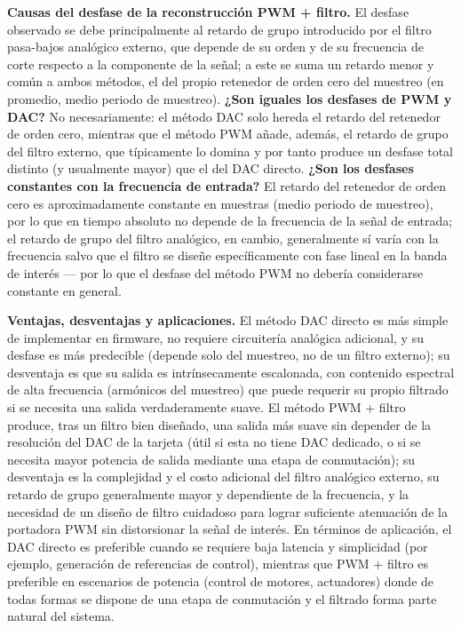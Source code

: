\textbf{Causas del desfase de la reconstrucción PWM + filtro.} El desfase observado se debe principalmente al retardo de grupo introducido por el filtro pasa-bajos analógico externo, que depende de su orden y de su frecuencia de corte respecto a la componente de la señal; a este se suma un retardo menor y común a ambos métodos, el del propio retenedor de orden cero del muestreo (en promedio, medio periodo de muestreo). \textbf{¿Son iguales los desfases de PWM y DAC?} No necesariamente: el método DAC solo hereda el retardo del retenedor de orden cero, mientras que el método PWM añade, además, el retardo de grupo del filtro externo, que típicamente lo domina y por tanto produce un desfase total distinto (y usualmente mayor) que el del DAC directo. \textbf{¿Son los desfases constantes con la frecuencia de entrada?} El retardo del retenedor de orden cero es aproximadamente constante en muestras (medio periodo de muestreo), por lo que en tiempo absoluto no depende de la frecuencia de la señal de entrada; el retardo de grupo del filtro analógico, en cambio, generalmente sí varía con la frecuencia salvo que el filtro se diseñe específicamente con fase lineal en la banda de interés — por lo que el desfase del método PWM no debería considerarse constante en general.

\textbf{Ventajas, desventajas y aplicaciones.} El método DAC directo es más simple de implementar en firmware, no requiere circuitería analógica adicional, y su desfase es más predecible (depende solo del muestreo, no de un filtro externo); su desventaja es que su salida es intrínsecamente escalonada, con contenido espectral de alta frecuencia (armónicos del muestreo) que puede requerir su propio filtrado si se necesita una salida verdaderamente suave. El método PWM + filtro produce, tras un filtro bien diseñado, una salida más suave sin depender de la resolución del DAC de la tarjeta (útil si esta no tiene DAC dedicado, o si se necesita mayor potencia de salida mediante una etapa de conmutación); su desventaja es la complejidad y el costo adicional del filtro analógico externo, su retardo de grupo generalmente mayor y dependiente de la frecuencia, y la necesidad de un diseño de filtro cuidadoso para lograr suficiente atenuación de la portadora PWM sin distorsionar la señal de interés. En términos de aplicación, el DAC directo es preferible cuando se requiere baja latencia y simplicidad (por ejemplo, generación de referencias de control), mientras que PWM + filtro es preferible en escenarios de potencia (control de motores, actuadores) donde de todas formas se dispone de una etapa de conmutación y el filtrado forma parte natural del sistema.

